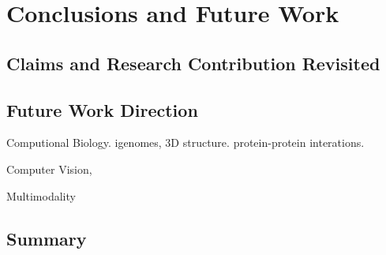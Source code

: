\chapter{Conclusions and Future Work}
\section{Claims and Research Contribution Revisited}

\section{Future Work Direction}


Computional Biology.
igenomes, 3D structure. protein-protein interations.

Computer Vision,

Multimodality

\section{Summary}


